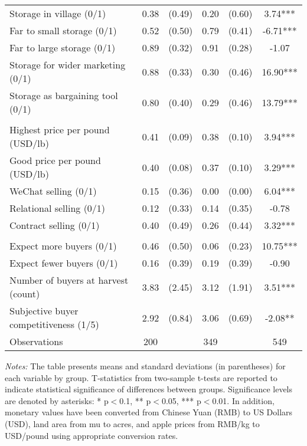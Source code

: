 \begin{table}[H]
{\begin{tabular}{lccccc}
Storage in village (0/1) & 0.38 & (0.49) & 0.20 & (0.60) & 3.74*** \\
Far to small storage (0/1) & 0.52 & (0.50) & 0.79 & (0.41) & -6.71*** \\
Far to large storage (0/1) & 0.89 & (0.32) & 0.91 & (0.28) & -1.07 \\
Storage for wider marketing (0/1) & 0.88 & (0.33) & 0.30 & (0.46) & 16.90*** \\
Storage as bargaining tool (0/1) & 0.80 & (0.40) & 0.29 & (0.46) & 13.79*** \\
\addlinespace
\multicolumn{6}{l}{\textbf{Panel D: Marketing}} \\
Highest price per pound (USD/lb) & 0.41 & (0.09) & 0.38 & (0.10) & 3.94*** \\
Good price per pound (USD/lb) & 0.40 & (0.08) & 0.37 & (0.10) & 3.29*** \\
WeChat selling (0/1) & 0.15 & (0.36) & 0.00 & (0.00) & 6.04*** \\
Relational selling (0/1) & 0.12 & (0.33) & 0.14 & (0.35) & -0.78 \\
Contract selling (0/1) & 0.40 & (0.49) & 0.26 & (0.44) & 3.32*** \\
\addlinespace
\multicolumn{6}{l}{\textbf{Panel E: Market Competitive Conditions}} \\
Expect more buyers (0/1) & 0.46 & (0.50) & 0.06 & (0.23) & 10.75*** \\
Expect fewer buyers (0/1) & 0.16 & (0.39) & 0.19 & (0.39) & -0.90 \\
Number of buyers at harvest (count) & 3.83 & (2.45) & 3.12 & (1.91) & 3.51*** \\
Subjective buyer competitiveness (1/5) & 2.92 & (0.84) & 3.06 & (0.69) & -2.08** \\
\hline
\hline
Observations & 200 & & 349 & & 549 \\
\bottomrule
\end{tabular}%
} %
\begin{tablenotes} 
\footnotesize
\item \textit{Notes:} The table presents means and standard deviations (in parentheses) for each variable by group. T-statistics from two-sample t-tests are reported to indicate statistical significance of differences between groups. Significance levels are denoted by asterisks: * p$<$0.1, ** p$<$0.05, *** p$<$0.01. In addition, monetary values have been converted from Chinese Yuan (RMB) to US Dollars (USD), land area from mu to acres, and apple prices from RMB/kg to USD/pound using appropriate conversion rates. 
\end{tablenotes} 
\end{table}
